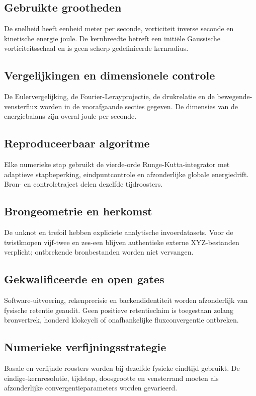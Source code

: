\documentclass[10pt,a4paper]{article}
\begin{document}
\subsection{Gebruikte grootheden}
De snelheid heeft eenheid meter per seconde, vorticiteit inverse seconde en kinetische energie joule. De kernbreedte betreft een initiële Gaussische vorticiteitsschaal en is geen scherp gedefinieerde kernradius.
\subsection{Vergelijkingen en dimensionele controle}
De Eulervergelijking, de Fourier-Lerayprojectie, de drukrelatie en de bewegende-vensterflux worden in de voorafgaande secties gegeven. De dimensies van de energiebalans zijn overal joule per seconde.
\subsection{Reproduceerbaar algoritme}
Elke numerieke stap gebruikt de vierde-orde Runge-Kutta-integrator met adaptieve stapbeperking, eindpuntcontrole en afzonderlijke globale energiedrift. Bron- en controletraject delen dezelfde tijdroosters.
\subsection{Brongeometrie en herkomst}
De unknot en trefoil hebben expliciete analytische invoerdatasets. Voor de twistknopen vijf-twee en zes-een blijven authentieke externe XYZ-bestanden verplicht; ontbrekende bronbestanden worden niet vervangen.
\subsection{Gekwalificeerde en open gates}
Software-uitvoering, rekenprecisie en backendidentiteit worden afzonderlijk van fysische retentie geaudit. Geen positieve retentieclaim is toegestaan zolang bronvertrek, honderd klokcycli of onafhankelijke fluxconvergentie ontbreken.
\subsection{Numerieke verfijningsstrategie}
Basale en verfijnde roosters worden bij dezelfde fysieke eindtijd gebruikt. De eindige-kernresolutie, tijdstap, doosgrootte en vensterrand moeten als afzonderlijke convergentieparameters worden gevarieerd.
\end{document}
